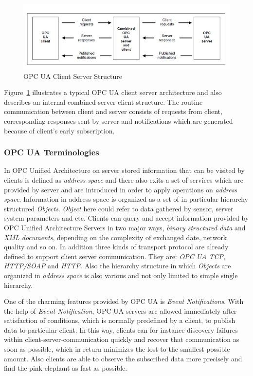 \documentclass[]{llncs}
\begin{document}
\begin{figure}[!htbp]
	\centering
	\includegraphics[width=1.00\textwidth]{cs.jpg}
		\caption[ ]{OPC UA Client Server Structure\cite{O1}}
	\label{fig:cs}
\end{figure}
Figure~\ref{fig:cs} illustrates a typical OPC UA client server architecture and also describes an internal combined server-client structure. The routine communication between client and server consists of requests from client, corresponding responses sent by server and notifications which are generated because of client's early subscription.

\subsubsection{OPC UA Terminologies}
In OPC Unified Architecture on server stored information that can be visited by clients is defined as \emph{address space}\cite{O3} and there also exits a set of services\cite{O4} which are provided by server and are introduced in order to apply operations on \emph{address space}. Information in address space is organized as a set of in particular hierarchy structured \emph{Objects}. \emph{Object} here could refer to data gathered by sensor, server system parameters and etc. Clients can query and accept information provided by OPC Unified Architecture Servers in two major ways, \emph{binary structured data} and \emph{XML documents}, depending on the complexity of exchanged date, network quality and so on. In addition three kinds of transport protocol are already defined to support client server communication. They are: \emph{OPC UA TCP}, \emph{HTTP/SOAP} and \emph{HTTP}. Also the hierarchy structure in which \emph{Objects} are organized in \emph{address space} is also various and not only limited to simple single hierarchy.   

One of the charming features provided by OPC UA is \emph{Event Notifications}. With the help of \emph{Event Notification}, OPC UA servers are allowed immediately after satisfaction of conditions, which is normally predefined by a client, to publish data to particular client. In this way, clients can for instance discovery failures within client-server-communication quickly and recover that communication as soon as possible, which in return minimizes the lost to the smallest possible amount. Also clients are able to observe the subscribed data more precisely and find the pink elephant as fast as possible.
\end{document}
